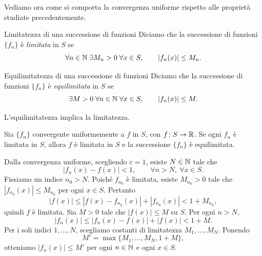 \documentclass[a4paper]{article}
\begin{document}
\begin{radioactive}
Vediamo ora come si comporta la convergenza uniforme rispetto
alle proprietà studiate precedentemente.
\end{radioactive}

\begin{radioactive}
\begin{snippetdefinition}{Limitatezza di una successione di funzioni}
    Diciamo che la successione di funzioni \(\{f_n\}\) è \emph{limitata} in \(S\) se
    \[
        \forall n\in\mathbb{N}\;\exists M_n>0\;\forall x\in S,
        \qquad |f_n(x)|\leq M_n.
    \]
\end{snippetdefinition}
\end{radioactive}

\begin{radioactive}
\begin{snippetdefinition}{Equilimitatezza di una successione di funzioni}
    Diciamo che la successione di funzioni \(\{f_n\}\) è \emph{equilimitata} in \(S\) se
    \[
        \exists M>0\;\forall n\in\mathbb{N}\;\forall x\in S,
        \qquad |f_n(x)|\leq M.
    \]
\end{snippetdefinition}
\end{radioactive}

\begin{radioactive}
L'equilimitatezza implica la limitatezza.
\end{radioactive}

\begin{radioactive}
\begin{snippetproposition}{}
    Sia \(\{f_n\}\) convergente uniformemente a \(f\) in \(S\), con
    \(f\colon S\to\mathbb{R}\). Se ogni \(f_n\) è limitata in \(S\),
    allora \(f\) è limitata in \(S\) e la successione \(\{f_n\}\) è equilimitata.
\end{snippetproposition}
\end{radioactive}

\begin{radioactive}
\begin{snippetproof}{}
    Dalla convergenza uniforme, scegliendo \(\varepsilon=1\), esiste
    \(N\in\mathbb{N}\) tale che
    \[
        |f_n(x)-f(x)|<1,
        \qquad \forall n>N,\ \forall x\in S.
    \]
    Fissiamo un indice \(n_0>N\). Poiché \(f_{n_0}\) è limitata, esiste
    \(M_{n_0}>0\) tale che \(|f_{n_0}(x)|\leq M_{n_0}\) per ogni \(x\in S\). Pertanto
    \[
        |f(x)|\leq |f(x)-f_{n_0}(x)|+|f_{n_0}(x)|<1+M_{n_0},
    \]
    quindi \(f\) è limitata. Sia \(M>0\) tale che \(|f(x)|\leq M\) su \(S\).
    Per ogni \(n>N\),
    \[
        |f_n(x)|\leq |f_n(x)-f(x)|+|f(x)|<1+M.
    \]
    Per i soli indici \(1,\ldots,N\), scegliamo costanti di limitatezza
    \(M_1,\ldots,M_N\). Ponendo
    \[
        M'=\max\{M_1,\ldots,M_N,1+M\},
    \]
    otteniamo \(|f_n(x)|\leq M'\) per ogni \(n\in\mathbb{N}\) e ogni \(x\in S\).
\end{snippetproof}
\end{radioactive}
\end{document}
